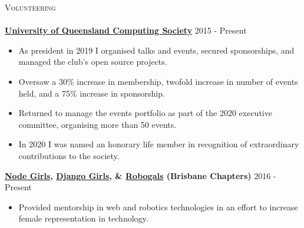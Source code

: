\documentclass[a4paper]{article}
\newcommand{\lineunder} {
    \vspace*{-8pt} \\
    \hspace*{-10pt} \hrulefill \\
}
\newcommand{\header} [1] {
    {\hspace*{-10pt}\vspace*{6pt} \textsc{#1}}
    \vspace*{-6pt} \lineunder
}
\newenvironment{singleitem}
{   \small
    \vspace{0pt}
    \begin{itemize}
    \setlength{\itemsep}{0pt}
    \setlength{\parskip}{0pt}
    \setlength{\parsep}{0pt}   }
{\end{itemize} \vspace{1pt}	}
\begin{document}
\vspace{0.8mm}

\header{Volunteering}
\textbf{\href{https://uqcs.org}{University of Queensland Computing Society}} \hfill 2015 - Present\\
\begin{singleitem}
	\item As president in 2019 I organised talks and events, secured sponsorships, and managed the club's open source projects.
	\item Oversaw a 30\% increase in membership, twofold increase in number of events held, and a 75\% increase in sponsorship.
	\item Returned to manage the events portfolio as part of the 2020 executive committee, organising more than 50 events.
	\item In 2020 I was named an honorary life member in recognition of extraordinary contributions to the society.
\end{singleitem}
\textbf{\href{https://www.nodegirls.com/}{Node Girls}, \href{https://djangogirls.org/}{Django Girls}, \& \href{https://robogalsbrisbane.org/}{Robogals} (Brisbane Chapters)} \hfill 2016 - Present\\
\begin{singleitem}
	\item Provided mentorship in web and robotics technologies in an effort to increase female representation in technology.
\end{singleitem}

\vspace{0.8mm}
\end{document}
